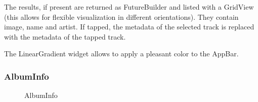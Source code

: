 \documentclass{article}
\begin{document}
The results, if present are returned as FutureBuilder and listed with a GridView
(this allows for flexible visualization in different orientations). They contain
image, name and artist. If tapped, the metadata of the selected track is
replaced with the metadata of the tapped track.

The LinearGradient widget allows to apply a pleasant color to the AppBar.

\subsubsection{AlbumInfo}

\begin{figure}[H]
	\noindent
	\caption{AlbumInfo} 
\end{figure}
\end{document}
